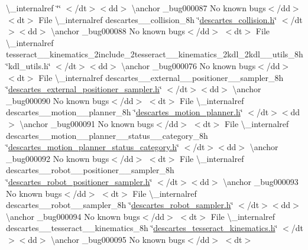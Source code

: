 \begin{DoxyRefList}
 \textbackslash{}\+\_\+internalref  \char`\"{}\char`\"{} $<$/dt$>$$<$dd$>$ \textbackslash{}anchor \+\_\+bug000087 No known bugs$<$/dd$>$ $<$dt$>$
\+File \textbackslash{}\+\_\+internalref descartes\+\_\+\+\_\+collision\+\_\+8h \char`\"{}\mbox{\hyperlink{descartes__collision_8h}{descartes\+\_\+collision.\+h}}\char`\"{} $<$/dt$>$$<$dd$>$ \textbackslash{}anchor \+\_\+bug000088 No known bugs$<$/dd$>$ $<$dt$>$
\+File \textbackslash{}\+\_\+internalref tesseract\+\_\+\+\_\+kinematics\+\_\+2include\+\_\+2tesseract\+\_\+\+\_\+kinematics\+\_\+2kdl\+\_\+2kdl\+\_\+\+\_\+utils\+\_\+8h \char`\"{}kdl\+\_\+utils.\+h\char`\"{} $<$/dt$>$$<$dd$>$ \textbackslash{}anchor \+\_\+bug000076 No known bugs$<$/dd$>$ $<$dt$>$
\+File \textbackslash{}\+\_\+internalref descartes\+\_\+\+\_\+external\+\_\+\+\_\+positioner\+\_\+\+\_\+sampler\+\_\+8h \char`\"{}\mbox{\hyperlink{descartes__external__positioner__sampler_8h}{descartes\+\_\+external\+\_\+positioner\+\_\+sampler.\+h}}\char`\"{} $<$/dt$>$$<$dd$>$ \textbackslash{}anchor \+\_\+bug000090 No known bugs$<$/dd$>$ $<$dt$>$
\+File \textbackslash{}\+\_\+internalref descartes\+\_\+\+\_\+motion\+\_\+\+\_\+planner\+\_\+8h \char`\"{}\mbox{\hyperlink{descartes__motion__planner_8h}{descartes\+\_\+motion\+\_\+planner.\+h}}\char`\"{} $<$/dt$>$$<$dd$>$ \textbackslash{}anchor \+\_\+bug000091 No known bugs$<$/dd$>$ $<$dt$>$
\+File \textbackslash{}\+\_\+internalref descartes\+\_\+\+\_\+motion\+\_\+\+\_\+planner\+\_\+\+\_\+status\+\_\+\+\_\+category\+\_\+8h \char`\"{}\mbox{\hyperlink{descartes__motion__planner__status__category_8h}{descartes\+\_\+motion\+\_\+planner\+\_\+status\+\_\+category.\+h}}\char`\"{} $<$/dt$>$$<$dd$>$ \textbackslash{}anchor \+\_\+bug000092 No known bugs$<$/dd$>$ $<$dt$>$
\+File \textbackslash{}\+\_\+internalref descartes\+\_\+\+\_\+robot\+\_\+\+\_\+positioner\+\_\+\+\_\+sampler\+\_\+8h \char`\"{}\mbox{\hyperlink{descartes__robot__positioner__sampler_8h}{descartes\+\_\+robot\+\_\+positioner\+\_\+sampler.\+h}}\char`\"{} $<$/dt$>$$<$dd$>$ \textbackslash{}anchor \+\_\+bug000093 No known bugs$<$/dd$>$ $<$dt$>$
\+File \textbackslash{}\+\_\+internalref descartes\+\_\+\+\_\+robot\+\_\+\+\_\+sampler\+\_\+8h \char`\"{}\mbox{\hyperlink{descartes__robot__sampler_8h}{descartes\+\_\+robot\+\_\+sampler.\+h}}\char`\"{} $<$/dt$>$$<$dd$>$ \textbackslash{}anchor \+\_\+bug000094 No known bugs$<$/dd$>$ $<$dt$>$
\+File \textbackslash{}\+\_\+internalref descartes\+\_\+\+\_\+tesseract\+\_\+\+\_\+kinematics\+\_\+8h \char`\"{}\mbox{\hyperlink{descartes__tesseract__kinematics_8h}{descartes\+\_\+tesseract\+\_\+kinematics.\+h}}\char`\"{} $<$/dt$>$$<$dd$>$ \textbackslash{}anchor \+\_\+bug000095 No known bugs$<$/dd$>$ $<$dt$>$
$$
\end{DoxyRefList}
